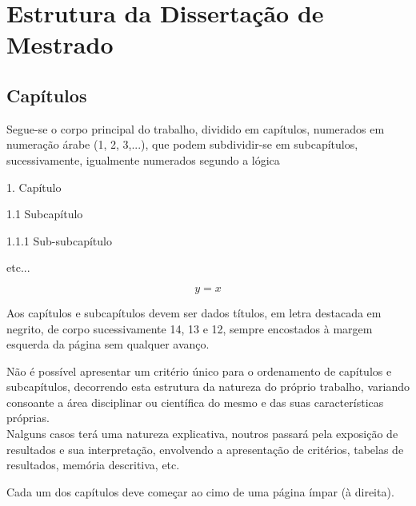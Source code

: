 % 
\chapter{Estrutura da Dissertação de Mestrado} %
\label{chap:Chapter1} %


%




\section{Capítulos}

Segue-se o corpo principal do trabalho, dividido em capítulos, numerados em numeração árabe (1, 2, 3,...), que podem subdividir-se em subcapítulos, sucessivamente, igualmente numerados segundo a lógica

1. Capítulo 

1.1 Subcapítulo 

1.1.1 Sub-subcapítulo 

etc...

\begin{equation}
y = x
\end{equation} 


Aos capítulos e subcapítulos devem ser dados títulos, em letra destacada em negrito, de corpo sucessivamente 14, 13 e 12, sempre encostados à margem esquerda da página sem qualquer avanço.

Não é possível apresentar um critério único para o ordenamento de capítulos e subcapítulos, decorrendo esta estrutura da natureza do próprio trabalho, variando consoante a área disciplinar ou científica do mesmo e das suas características próprias.\\
Nalguns casos terá uma natureza explicativa, noutros passará pela exposição de resultados e sua interpretação, envolvendo a apresentação de critérios, tabelas de resultados, memória descritiva, etc.

Cada um dos capítulos deve começar ao cimo de uma página ímpar (à direita).
